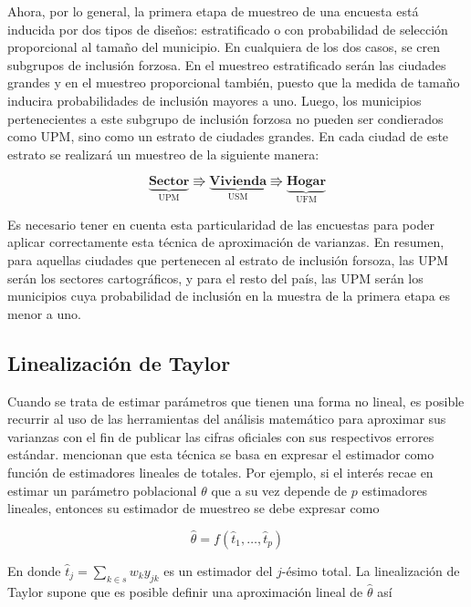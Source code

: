 \documentclass[12pt,spanish,]{book}
\begin{document}
Ahora, por lo general, la primera etapa de muestreo de una encuesta está inducida por dos tipos de diseños: estratificado o con probabilidad de selección proporcional al tamaño del municipio. En cualquiera de los dos casos, se cren subgrupos de inclusión forzosa. En el muestreo estratificado serán las ciudades grandes y en el muestreo proporcional también, puesto que la medida de tamaño inducira probabilidades de inclusión mayores a uno.
Luego, los municipios pertenecientes a este subgrupo de inclusión forzosa no pueden ser condierados como UPM, sino como un estrato de ciudades grandes. En cada ciudad de este estrato se realizará un muestreo de la siguiente manera:

\begin{equation*}
\underbrace{\textbf{Sector}}_{\text{UPM}} \Rrightarrow
\underbrace{\textbf{Vivienda}}_{\text{USM}} \Rrightarrow
\underbrace{\textbf{Hogar}}_{\text{UFM}}
\end{equation*}

Es necesario tener en cuenta esta particularidad de las encuestas para poder aplicar correctamente esta técnica de aproximación de varianzas. En resumen, para aquellas ciudades que pertenecen al estrato de inclusión forsoza, las UPM serán los sectores cartográficos, y para el resto del país, las UPM serán los municipios cuya probabilidad de inclusión en la muestra de la primera etapa es menor a uno.

\hypertarget{linealizacion-de-taylor}{%
\subsection{Linealización de Taylor}\label{linealizacion-de-taylor}}

Cuando se trata de estimar parámetros que tienen una forma no lineal, es posible recurrir al uso de las herramientas del análisis matemático para aproximar sus varianzas con el fin de publicar las cifras oficiales con sus respectivos errores estándar. \textcite{Valliant_Dever_Kreuter_2013} mencionan que esta técnica se basa en expresar el estimador como función de estimadores lineales de totales. Por ejemplo, si el interés recae en estimar un parámetro poblacional \(\theta\) que a su vez depende de \(p\) estimadores lineales, entonces su estimador de muestreo se debe expresar como

\[
\hat{\theta}=f(\hat{t}_1, \ldots, \hat{t}_p)
\]

En donde \(\hat{t}_j=\sum_{k\in s}w_k y_{jk}\) es un estimador del \(j\)-ésimo total. La linealización de Taylor supone que es posible definir una aproximación lineal de \(\hat{\theta}\) así
\end{document}
